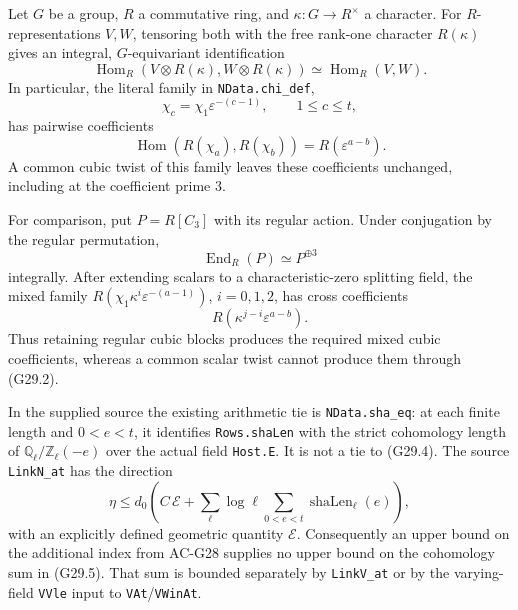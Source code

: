 \begin{theorem}
\label{AC-G29}
Let $G$ be a group, $R$ a commutative ring, and
$\kappa:G\to R^\times$ a character.  For $R$-representations
$V,W$, tensoring both with the free rank-one character
$R(\kappa)$ gives an integral, $G$-equivariant identification
\[
 \operatorname{Hom}_R(V\otimes R(\kappa),
                     W\otimes R(\kappa))
       \simeq\operatorname{Hom}_R(V,W).                 \tag{G29.1}
\]
In particular, the literal family in \texttt{NData.chi\_def},
\[
          \chi_c=\chi_1\varepsilon^{-(c-1)},
                         \qquad 1\le c\le t,
\]
has pairwise coefficients
\[
 \operatorname{Hom}(R(\chi_a),R(\chi_b))
                =R(\varepsilon^{a-b}).                 \tag{G29.2}
\]
A common cubic twist of this family leaves these coefficients
unchanged, including at the coefficient prime $3$.

For comparison, put $P=R[C_3]$ with its regular action.
Under conjugation by the regular permutation,
\[
              \operatorname{End}_R(P)\simeq P^{\oplus3}
                                                        \tag{G29.3}
\]
integrally.  After extending scalars to a characteristic-zero
splitting field, the mixed family
$R(\chi_1\kappa^i\varepsilon^{-(a-1)})$, $i=0,1,2$,
has cross coefficients
\[
       R(\kappa^{j-i}\varepsilon^{a-b}).                \tag{G29.4}
\]
Thus retaining regular cubic blocks produces the required
mixed cubic coefficients, whereas a common scalar twist
cannot produce them through (G29.2).

In the supplied source the existing arithmetic tie is
\texttt{NData.sha\_eq}: at each finite length and
$0<e<t$, it identifies \texttt{Rows.shaLen} with the
strict cohomology length of
$\mathbb Q_\ell/\mathbb Z_\ell(-e)$ over the actual field
\texttt{Host.E}.  It is not a tie to (G29.4).
The source \texttt{LinkN\_at} has the direction
\[
 \eta\le d_0\left(C\,\mathcal E+
           \sum_\ell\log\ell\sum_{0<e<t}
                    \operatorname{shaLen}_\ell(e)\right),
                                                        \tag{G29.5}
\]
with an explicitly defined geometric quantity $\mathcal E$.
Consequently an upper bound on the additional index from
AC-G28 supplies no upper bound on the cohomology sum in
(G29.5).  That sum is bounded separately by
\texttt{LinkV\_at} or by the varying-field \texttt{VVle}
input to \texttt{VAt}/\texttt{VWinAt}.
\end{theorem}

